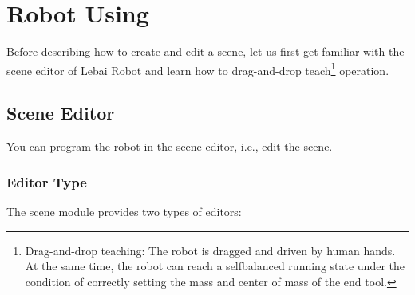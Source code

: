 \chapter{Robot Using}


Before describing how to create and edit a scene, let us first get familiar with the scene editor of Lebai Robot and learn how to drag-and-drop teach\footnote{Drag-and-drop teaching: The robot is dragged and driven by human hands. At the same time, the robot can reach a self­balanced running state under the condition of correctly setting the mass and center of mass of the end tool.} operation.


\section{Scene Editor}

You can program the robot in the scene editor, i.e., edit the scene.
\subsection{Editor Type}

The scene module provides two types of editors:

\newpage

